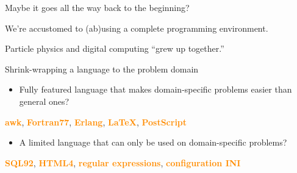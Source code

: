 \documentclass[aspectratio=169]{beamer}
\begin{document}
\begin{frame}{Maybe it goes all the way back to the beginning?}
\large
\vspace{0.5 cm}

We're accustomed to (ab)using a complete programming environment.

\vspace{0.5 cm}
Particle physics and digital computing ``grew up together.''

\vspace{1 cm}
\end{frame}

\begin{frame}{Shrink-wrapping a language to the problem domain}
\large
\begin{itemize}
\item Fully featured language that makes domain-specific problems easier than general ones?
\end{itemize}

\begin{center}
\textcolor{darkorange}{\bf awk}, \textcolor{darkorange}{\bf Fortran77}, \textcolor{darkorange}{\bf Erlang}, \textcolor{darkorange}{\bf \LaTeX}, \textcolor{darkorange}{\bf PostScript}
\end{center}

\begin{itemize}
\item A limited language that can only be used on domain-specific problems?
\end{itemize}

\begin{center}
\textcolor{darkorange}{\bf SQL92}, \textcolor{darkorange}{\bf HTML4}, \textcolor{darkorange}{\bf regular expressions}, \textcolor{darkorange}{\bf configuration INI}
\end{center}
\end{frame}
\end{document}
